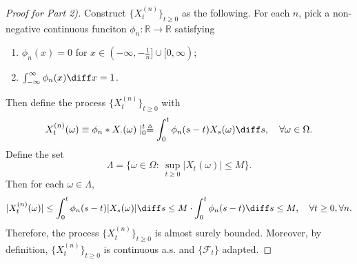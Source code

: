 \begin{proof}[Proof for Part 2)]
Construct $\{X_t^{(n)}\}_{t\ge0}$ as the following.
For each $n$, pick a non-negative continuous funciton $\phi_n:\mathbb{R}\to\mathbb{R}$ satisfying
\begin{enumerate}
\item
$\phi_n(x)=0$ for $x\in(-\infty,-\frac{1}{n}]\cup[0,\infty)$;
\item
$\int_{-\infty}^{\infty}\phi_n(x)\diff x=1$.
\end{enumerate}
Then define the process $\{X_t^{(n)}\}_{t\ge0}$ with
\[
X_t^{(n)}(\omega) \equiv \phi_n* X_{\cdot}(\omega)\mid_{0}^t\triangleq \int_0^t\phi_n(s-t)X_s(\omega)\diff s,\quad\forall\omega\in\Omega.
\]
Define the set
\[
\Lambda=\bigg\{
\omega\in\Omega:~
\sup_{t\ge0}|X_t(\omega)|\le M
\bigg\}.
\]
Then for each $\omega\in\Lambda$,
\[
|X_t^{(n)}(\omega)|\le  \int_0^t\phi_n(s-t)|X_s(\omega)|\diff s\le M\cdot \int_0^t\phi_n(s-t)\diff s\le M,\quad
\forall t\ge0,\forall n.
\]
Therefore, the process $\{X_t^{(n)}\}_{t\ge0}$ is almost surely bounded. Moreover, by definition,
$\{X_t^{(n)}\}_{t\ge0}$ is continuous a.s. and $\{\mathcal{F}_t\}$ adapted.


\end{proof}
